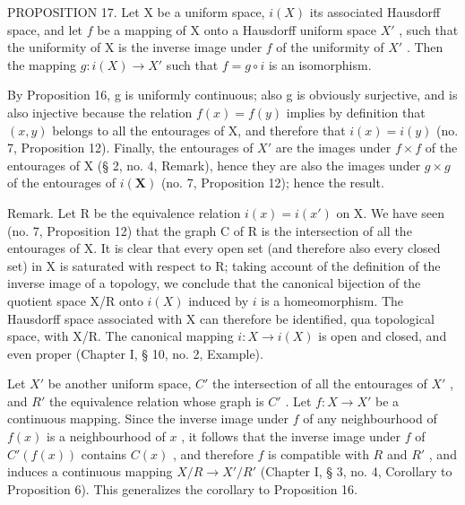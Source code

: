 PROPOSITION 17. Let X be a uniform space, \(i(X)\) its associated Hausdorff space, and let \(f\) be a mapping of X onto a Hausdorff uniform space \(X'\) , such that the uniformity of X is the inverse image under \(f\) of the uniformity of \(X'\) . Then the mapping \(g:i(X)\to X'\) such that \(f=g\circ i\) is an isomorphism.

By Proposition 16, g is uniformly continuous; also g is obviously surjective, and is also injective because the relation \(f(x) = f(y)\) implies by definition that \((x,y)\) belongs to all the entourages of X, and therefore that \(i(x)=i(y)\) (no. 7, Proposition 12). Finally, the entourages of \(X'\) are the images under \(f\times f\) of the entourages of X (§ 2, no. 4, Remark), hence they are also the images under \(g\times g\) of the entourages of \(i(\mathbf{X})\) (no. 7, Proposition 12); hence the result.

Remark. Let R be the equivalence relation \(i(x) = i(x')\) on X. We have seen (no. 7, Proposition 12) that the graph C of R is the intersection of all the entourages of X. It is clear that every open set (and therefore also every closed set) in X is saturated with respect to R; taking account of the definition of the inverse image of a topology, we conclude that the canonical bijection of the quotient space X/R onto \(i(X)\) induced by \(i\) is a homeomorphism. The Hausdorff space associated with X can therefore be identified, qua topological space, with X/R. The canonical mapping \(i: X \to i(X)\) is open and closed, and even proper (Chapter I, § 10, no. 2, Example).

Let \(X'\) be another uniform space, \(C'\) the intersection of all the entourages of \(X'\) , and \(R'\) the equivalence relation whose graph is \(C'\) . Let \(f: X \to X'\) be a continuous mapping. Since the inverse image under \(f\) of any neighbourhood of \(f(x)\) is a neighbourhood of \(x\) , it follows that the inverse image under \(f\) of \(C'(f(x))\) contains \(C(x)\) , and therefore \(f\) is compatible with \(R\) and \(R'\) , and induces a continuous mapping \(X/R \to X'/R'\) (Chapter I, § 3, no. 4, Corollary to Proposition 6). This generalizes the corollary to Proposition 16.

